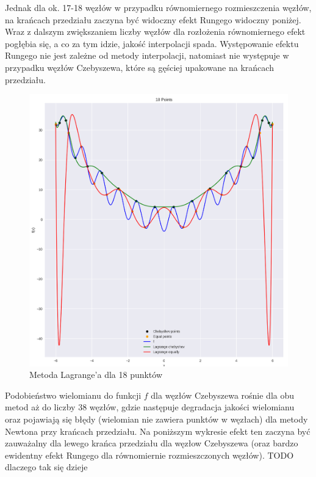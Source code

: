 \documentclass{article}
\begin{document}
Jednak dla ok. 17-18 węzłów w przypadku równomiernego rozmieszczenia węzłów, na krańcach przedziału zaczyna być widoczny efekt 
Rungego widoczny poniżej. Wraz z dalszym zwiększaniem liczby węzłów dla rozłożenia równomiernego efekt pogłębia się, a co za tym idzie,
jakość interpolacji spada. Występowanie efektu Rungego nie jest zależne od metody interpolacji, natomiast nie występuje w przypadku węzłów 
Czebyszewa, które są gęściej upakowane na krańcach przedziału.

\begin{figure}[H]
    \centering
    \includegraphics[width=\textwidth]{img/lagr_18.png}
    \caption{Metoda Lagrange'a dla 18 punktów}
\end{figure}

Podobieństwo wielomianu do funkcji $f$ dla węzłów Czebyszewa rośnie dla obu metod aż do liczby 38 węzłów, gdzie następuje degradacja
jakości wielomianu oraz pojawiają się błędy (wielomian nie zawiera punktów w węzłach) dla metody Newtona przy krańcach przedziału. Na poniższym wykresie efekt ten zaczyna być zauważalny dla lewego krańca
przedziału dla węzłow Czebyszewa (oraz bardzo ewidentny efekt Rungego dla równomiernie rozmieszczonych węzłów). TODO dlaczego tak się dzieje
\end{document}
